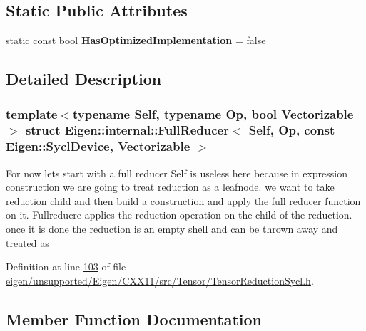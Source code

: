 \subsection*{Static Public Attributes}
\begin{DoxyCompactItemize}
\item 
\mbox{\label{struct_eigen_1_1internal_1_1_full_reducer_3_01_self_00_01_op_00_01const_01_eigen_1_1_sycl_device_00_01_vectorizable_01_4_ad34ed0cca9c578fc6611f1197a6d76bf}} 
static const bool {\bfseries Has\+Optimized\+Implementation} = false
\end{DoxyCompactItemize}


\subsection{Detailed Description}
\subsubsection*{template$<$typename Self, typename Op, bool Vectorizable$>$\newline
struct Eigen\+::internal\+::\+Full\+Reducer$<$ Self, Op, const Eigen\+::\+Sycl\+Device, Vectorizable $>$}

For now let\textquotesingle{}s start with a full reducer Self is useless here because in expression construction we are going to treat reduction as a leafnode. we want to take reduction child and then build a construction and apply the full reducer function on it. Fullreducre applies the reduction operation on the child of the reduction. once it is done the reduction is an empty shell and can be thrown away and treated as 

Definition at line \hyperlink{eigen_2unsupported_2_eigen_2_c_x_x11_2src_2_tensor_2_tensor_reduction_sycl_8h_source_l00103}{103} of file \hyperlink{eigen_2unsupported_2_eigen_2_c_x_x11_2src_2_tensor_2_tensor_reduction_sycl_8h_source}{eigen/unsupported/\+Eigen/\+C\+X\+X11/src/\+Tensor/\+Tensor\+Reduction\+Sycl.\+h}.



\subsection{Member Function Documentation}
\mbox{\label{struct_eigen_1_1internal_1_1_full_reducer_3_01_self_00_01_op_00_01const_01_eigen_1_1_sycl_device_00_01_vectorizable_01_4_aee608a1f9a8dca2b99477c2738357c05}} 
